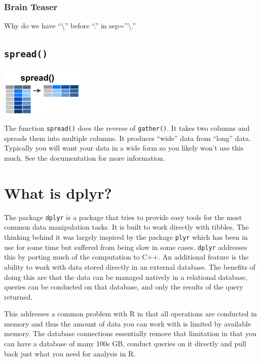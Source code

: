 \documentclass[
]{book}
\begin{document}
\subsubsection*{Brain Teaser}\label{brain-teaser-1}

Why do we have ``\textbackslash{}'' before ``.'' in sep=''\textbackslash.''

\subsection*{\texorpdfstring{\texttt{spread()}}{spread()}}\label{spread}

\includegraphics{./figures/tidyr-spread.png}

The function \texttt{spread()} does the reverse of \texttt{gather()}. It takes two columns and spreads them into multiple columns. It produces ``wide'' data from ``long'' data. Typically you will want your data in a wide form so you likely won't use this much. See the documentation for more information.

\section{What is dplyr?}\label{what-is-dplyr}

The package \texttt{dplyr} is a package that tries to provide easy tools for the most common data manipulation tasks. It is built to work directly with tibbles. The thinking behind it was largely inspired by the package \texttt{plyr} which has been in use for some time but suffered from being slow in some cases. \texttt{dplyr} addresses this by porting much of the computation to C++. An additional feature is the ability to work with data stored directly in an external database. The benefits of doing this are that the data can be managed natively in a relational database, queries can be conducted on that database, and only the results of the query returned.

This addresses a common problem with R in that all operations are conducted in memory and thus the amount of data you can work with is limited by available memory. The database connections essentially remove that limitation in that you can have a database of many 100s GB, conduct queries on it directly and pull back just what you need for analysis in R.
\end{document}
